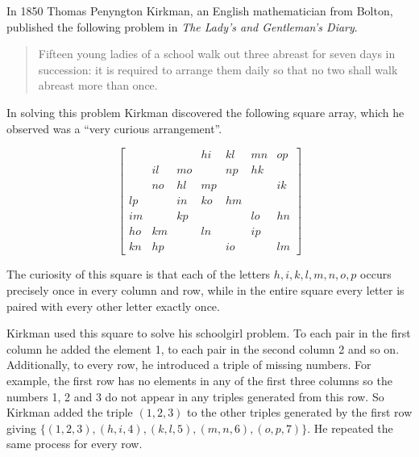 In 1850 Thomas Penyngton Kirkman, an English mathematician from Bolton, published the following problem in \emph{The Lady’s and Gentleman’s Diary}.

\begin{quotation}
Fifteen young ladies of a school walk out three abreast for seven days in succession: it is required to arrange them daily so that no two shall walk abreast more than once.
\end{quotation}

In solving this problem Kirkman discovered the following square array, which he observed was a ``very curious arrangement''.

\begin{equation}
  \begin{bmatrix}
       &    &    & hi & kl & mn & op \\
       & il & mo &    & np & hk &    \\
       & no & hl & mp &    &    & ik \\
    lp &    & in & ko & hm &    &    \\
    im &    & kp &    &    & lo & hn \\
    ho & km &    & ln &    & ip &    \\
    kn & hp &    &    & io &    & lm 
  \end{bmatrix}
  \label{eq:roomsquare}
\end{equation}

The curiosity of this square is that each of the letters
$h, i, k, l, m, n, o, p$
occurs precisely once in every column and row, while in the entire square every letter is paired with every other letter exactly once.

Kirkman used this square to solve his schoolgirl problem.
To each pair in the first column he added the element 1, to each pair in the second column 2 and so on.
Additionally, to every row, he introduced a triple of missing numbers.
For example, the first row has no elements in any of the first three columns so the numbers 1, 2 and 3 do not appear in any triples generated from this row.
So Kirkman added the triple $(1, 2, 3)$ to the other triples generated by the first row giving $\{(1, 2, 3), (h, i, 4), (k, l, 5), (m, n, 6), (o, p, 7)\}$.
He repeated the same process for every row.

